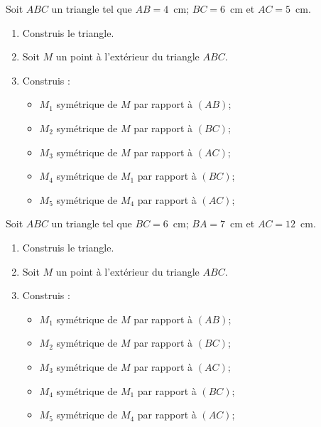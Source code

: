 \begin{myenumerate}
  \item Soit $ABC$ un triangle tel que $AB=4$~cm; $BC=6$~cm et $AC=5$~cm.
\begin{enumerate}
\item Construis le triangle.
\item Soit $M$ un point à l'extérieur du triangle $ABC$.
\item Construis :
  \begin{itemize}
  \item $M_1$ symétrique de $M$ par rapport à $(AB)$;
  \item $M_2$ symétrique de $M$ par rapport à $(BC)$;
  \item $M_3$ symétrique de $M$ par rapport à $(AC)$;
  \item $M_4$ symétrique de $M_1$ par rapport à $(BC)$;
  \item $M_5$ symétrique de $M_4$ par rapport à $(AC)$;
  \end{itemize}
\end{enumerate}
\item Soit $ABC$ un triangle tel que $BC=6$~cm; $BA=7$~cm et $AC=12$~cm.
\begin{enumerate}
\item Construis le triangle.
\item Soit $M$ un point à l'extérieur du triangle $ABC$.
\item Construis :
  \begin{itemize}
  \item $M_1$ symétrique de $M$ par rapport à $(AB)$;
  \item $M_2$ symétrique de $M$ par rapport à $(BC)$;
  \item $M_3$ symétrique de $M$ par rapport à $(AC)$;
  \item $M_4$ symétrique de $M_1$ par rapport à $(BC)$;
  \item $M_5$ symétrique de $M_4$ par rapport à $(AC)$;
  \end{itemize}
\end{enumerate}
\end{myenumerate}